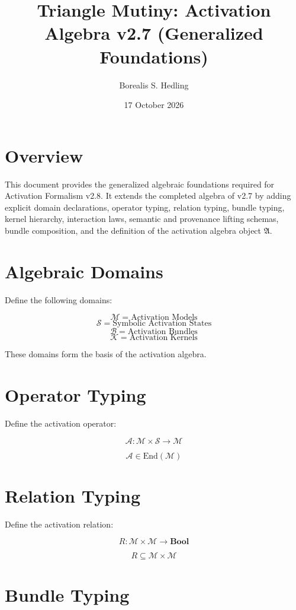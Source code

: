 \documentclass[11pt]{article}
\title{Triangle Mutiny: Activation Algebra v2.7 (Generalized Foundations)}
\author{Borealis S. Hedling}
\date{17 October 2026}
\begin{document}
\maketitle

\section*{Overview}

This document provides the generalized algebraic foundations required for
Activation Formalism v2.8. It extends the completed algebra of v2.7 by adding
explicit domain declarations, operator typing, relation typing, bundle typing,
kernel hierarchy, interaction laws, semantic and provenance lifting schemas,
bundle composition, and the definition of the activation algebra object
$\mathfrak{A}$.

\section*{Algebraic Domains}

Define the following domains:

\[
\mathcal{M} = \text{Activation Models}
\]
\[
\mathcal{S} = \text{Symbolic Activation States}
\]
\[
\mathcal{B} = \text{Activation Bundles}
\]
\[
\mathcal{K} = \text{Activation Kernels}
\]

These domains form the basis of the activation algebra.

\section*{Operator Typing}

Define the activation operator:

\[
\mathcal{A} : \mathcal{M} \times \mathcal{S} \to \mathcal{M}
\]

\[
\mathcal{A} \in \text{End}(\mathcal{M})
\]

\section*{Relation Typing}

Define the activation relation:

\[
R : \mathcal{M} \times \mathcal{M} \to \mathbf{Bool}
\]

\[
R \subseteq \mathcal{M} \times \mathcal{M}
\]

\section*{Bundle Typing}
\end{document}
